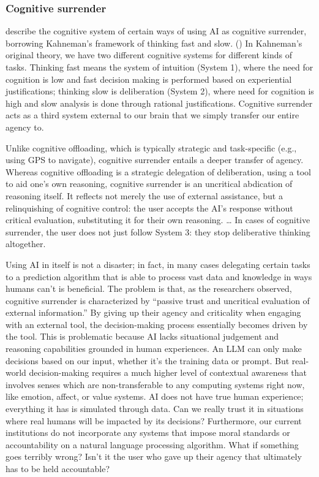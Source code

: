\documentclass[12pt]{article}
\begin{document}
\subsubsection{Cognitive surrender}
\cite{surrender} describe the cognitive system of certain ways of using AI as cognitive surrender, borrowing Kahneman's framework of thinking fast and slow. (\cite{fastandslow}) In Kahneman's original theory, we have two different cognitive systems for different kinds of tasks. Thinking fast means the system of intuition (System 1), where the need for cognition is low and fast decision making is performed based on experiential justifications; thinking slow is deliberation (System 2), where need for cognition is high and slow analysis is done through rational justifications. Cognitive surrender acts as a third system external to our brain that we simply transfer our entire agency to. 
\begin{displayquote}
Unlike cognitive offloading, which is typically strategic and task-specific (e.g., using GPS to navigate), cognitive surrender entails a deeper transfer of agency. Whereas cognitive offloading is a strategic delegation of deliberation, using a tool to aid one's own reasoning, cognitive surrender is an uncritical abdication of reasoning itself. It reflects not merely the use of external assistance, but a relinquishing of cognitive control: the user accepts the AI's response without critical evaluation, substituting it for their own reasoning. … In cases of cognitive surrender, the user does not just follow System 3: they stop deliberative thinking altogether.
\end{displayquote}
Using AI in itself is not a disaster; in fact, in many cases delegating certain tasks to a prediction algorithm that is able to process vast data and knowledge in ways humans can't is beneficial. The problem is that, as the researchers observed, cognitive surrender is characterized by ``passive trust and uncritical evaluation of external information.'' By giving up their agency and criticality when engaging with an external tool, the decision-making process essentially becomes driven by the tool. This is problematic because AI lacks situational judgement and reasoning capabilities grounded in human experiences. An LLM can only make decisions based on our input, whether it's the training data or prompt. But real-world decision-making requires a much higher level of contextual awareness that involves senses which are non-transferable to any computing systems right now, like emotion, affect, or value systems. AI does not have true human experience; everything it has is simulated through data. Can we really trust it in situations where real humans will be impacted by its decisions? Furthermore, our current institutions do not incorporate any systems that impose moral standards or accountability on a natural language processing algorithm. What if something goes terribly wrong? Isn't it the user who gave up their agency that ultimately has to be held accountable? 
\end{document}
